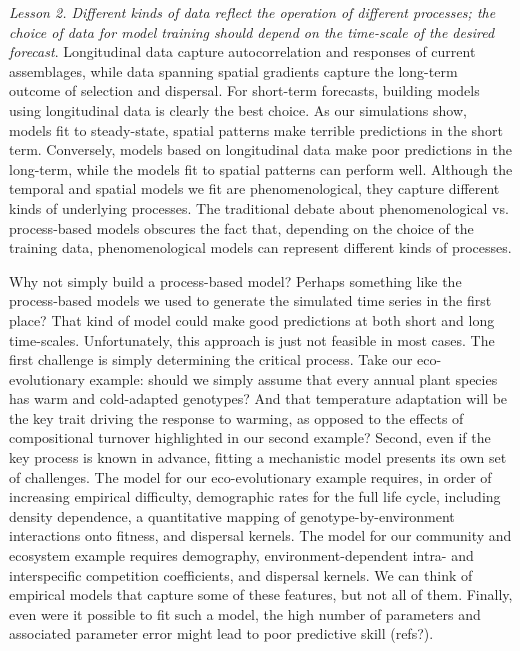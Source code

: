 \documentclass[11pt]{article}
\begin{document}
\emph{Lesson 2. Different kinds of data reflect the operation of different processes; the choice of data for model training should depend on the time-scale of the desired forecast}.
Longitudinal data capture autocorrelation and responses of current assemblages, while data spanning spatial gradients capture the long-term outcome of 
selection and dispersal. For short-term forecasts, building models using longitudinal data is clearly the best choice. As our simulations show, models fit to 
steady-state, spatial patterns make terrible predictions in the short term. Conversely, models based on longitudinal data make poor predictions in the long-term,
while the models fit to spatial patterns can perform well. Although the temporal and spatial models we fit are phenomenological, they capture different kinds
 of underlying processes. The traditional debate about phenomenological vs. process-based models obscures the fact that, depending on the choice of the
 training data, phenomenological models can represent different kinds of processes.
 
 Why not simply build a process-based model? Perhaps something like the process-based models we used to generate the simulated time series in the first place? 
 That kind of model could make good predictions at both short and long time-scales. Unfortunately, this approach is just not feasible in most cases.
 The first challenge is simply determining the critical process. Take our eco-evolutionary example: should we simply assume that every annual plant species
 has warm and cold-adapted genotypes? And that temperature adaptation will be the key trait driving the response to warming, as opposed to the effects of 
 compositional turnover highlighted in our second example? Second, even if the key process is known in advance, fitting a mechanistic model presents its
 own set of challenges. The model for our eco-evolutionary example requires, in order of increasing empirical difficulty, demographic rates for the full life
 cycle, including density dependence, a quantitative mapping of genotype-by-environment interactions onto fitness, and dispersal kernels. The model for 
 our community and ecosystem example requires demography, environment-dependent intra- and interspecific competition coefficients, and dispersal kernels.
 We can think of empirical models that capture some of these features, but not all of them. Finally, even were it possible to fit such a model, the high number of 
 parameters and associated parameter error might lead to poor predictive skill (refs?).
 
\end{document}
